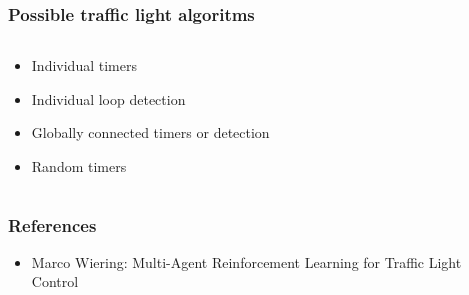 \documentclass[11pt]{beamer}
\begin{document}
\begin{frame}
\frametitle{Possible traffic light algoritms}
\begin{columns}
    \begin{column}{.5\textwidth}
        \begin{itemize}
            \item Individual timers
            \item Individual loop detection
            \item Globally connected timers or detection
            \item Random timers
        \end{itemize}
    \end{column}
    \begin{column}{.5\textwidth}
    \end{column}
\end{columns}
\end{frame}

\begin{frame}
\frametitle{References}
\begin{itemize}
    \item Marco Wiering: Multi-Agent Reinforcement Learning for Traffic Light Control
\end{itemize}
\end{frame}
\end{document}
